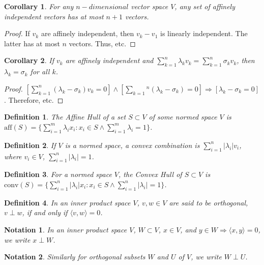 \documentclass[oneside]{book}
\theoremstyle{mystyle}
\newtheorem{definition}{Definition}[section]
\newtheorem{corollary}{Corollary}[section]
\newtheorem{notation}{Notation}[section]
\begin{document}
\begin{corollary}
For any $n-dimensional$ vector space $V$, any set of affinely independent vectors has at most $n+1$ vectors.
\end{corollary}
\begin{proof}
If $v_k$ are affinely independent, then $v_k-v_1$ is linearly independent. The latter has at most $n$ vectors. Thus, etc.
\end{proof}

\begin{corollary}
If $v_k$ are affinely independent and $\sum_{k=1}^{n}\lambda_k v_k = \sum_{k=1}^{n} \sigma_k v_k$, then $\lambda_k = \sigma_k$ for all $k$.
\end{corollary}
\begin{proof}
$[\sum_{k=1}^{n}(\lambda_k - \sigma_k)v_k = 0]\land[\sum_{k=1}{^n}(\lambda_k-\sigma_k) = 0]\Rightarrow [\lambda_k-\sigma_k = 0]$. Therefore, etc.
\end{proof}

\begin{definition}
The Affine Hull of a set $S\subset V$ of some normed space $V$ is $\textrm{aff}(S) = \{\sum_{i=1}^{m}\lambda_i x_i: x_i \in S\land \sum_{i=1}^{m}\lambda_i =1\}$.
\end{definition}

\begin{definition}
If $V$ is a normed space, a convex combination is $\sum_{i=1}^{n}|\lambda_i| v_i$, where $v_i\in V$, $\sum_{i=1}^{n}|\lambda_i| = 1$.
\end{definition}

\begin{definition}
For a normed space $V$, the Convex Hull of $S\subset V$ is $\textrm{conv}(S)=\{\sum_{i=1}^{n}|\lambda_i| x_i:x_i\in S\land \sum_{i=1}^{n} |\lambda_i| = 1 \}$.
\end{definition}

\begin{definition}
In an inner product space $V$, $v,w\in V$ are said to be orthogonal, $v\perp w$, if and only if $\langle v,w \rangle = 0$.
\end{definition}

\begin{notation}
In an inner product space $V$, $W\subset V$, $x\in V$, and $y\in W \Rightarrow \langle x,y\rangle = 0$, we write $x\perp W$.
\end{notation}

\begin{notation}
Similarly for orthogonal subsets $W$ and $U$ of $V$, we write $W\perp U$.
\end{notation}
\end{document}

